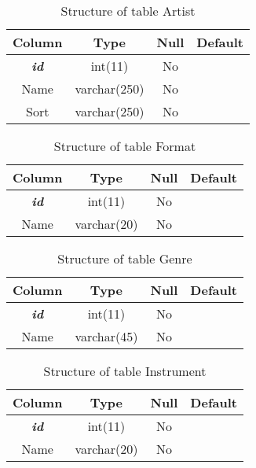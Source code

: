 %
%
\begin{longtable}{|c|c|c|c|} 
\caption{Structure of table Artist} 
\label{tab:Artist-structure} \\
\hline 
\multicolumn{1}{|c|}{\textbf{Column}} & \multicolumn{1}{|c|}{\textbf{Type}} & \multicolumn{1}{|c|}{\textbf{Null}} & \multicolumn{1}{|c|}{\textbf{Default}} \\ 
\hline
\textbf{\textit{id}} & int(11) & No &  \\ 
\hline 
Name & varchar(250) & No &  \\ 
\hline 
Sort & varchar(250) & No &  \\ 
\hline 
\end{longtable}

%
%
\begin{longtable}{|c|c|c|c|} 
\caption{Structure of table Format} 
\label{tab:Format-structure} \\
\hline 
\multicolumn{1}{|c|}{\textbf{Column}} & \multicolumn{1}{|c|}{\textbf{Type}} & \multicolumn{1}{|c|}{\textbf{Null}} & \multicolumn{1}{|c|}{\textbf{Default}} \\ 
\hline
\textbf{\textit{id}} & int(11) & No &  \\ 
\hline 
Name & varchar(20) & No &  \\ 
\hline 
\end{longtable}

%
%
\begin{longtable}{|c|c|c|c|} 
\caption{Structure of table Genre} 
\label{tab:Genre-structure} \\
\hline 
\multicolumn{1}{|c|}{\textbf{Column}} & \multicolumn{1}{|c|}{\textbf{Type}} & \multicolumn{1}{|c|}{\textbf{Null}} & \multicolumn{1}{|c|}{\textbf{Default}} \\ 
\hline
\textbf{\textit{id}} & int(11) & No &  \\ 
\hline 
Name & varchar(45) & No &  \\ 
\hline 
\end{longtable}

%
%
\begin{longtable}{|c|c|c|c|} 
\caption{Structure of table Instrument} 
\label{tab:Instrument-structure} \\
\hline 
\multicolumn{1}{|c|}{\textbf{Column}} & \multicolumn{1}{|c|}{\textbf{Type}} & \multicolumn{1}{|c|}{\textbf{Null}} & \multicolumn{1}{|c|}{\textbf{Default}} \\ 
\hline
\textbf{\textit{id}} & int(11) & No &  \\ 
\hline 
Name & varchar(20) & No &  \\ 
\hline 
\end{longtable}

